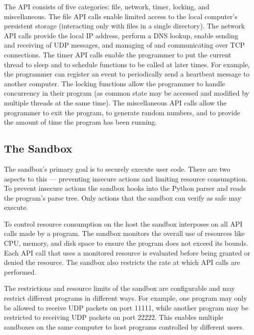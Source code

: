 The API consists of five categories: file, network, timer, locking,
and miscellaneous. The file API calls enable limited access to the
local computer's persistent storage (interacting only with files in a 
single directory). 
The network API calls
provide the local IP address, perform a DNS lookup, enable sending and
receiving of UDP messages, and managing of and communicating over TCP
connections. The timer API calls enable the programmer to put the
current thread to sleep and to schedule functions to be called at
later times. For example, the programmer can register an event to
periodically send a heartbeat message to another computer. The locking
functions allow the programmer to handle concurrency in their program
(as common state may be accessed and modified by multiple threads at
the same time). The miscellaneous API calls allow the programmer to
exit the program, to generate random numbers, and to provide the
amount of time the program has been running.


\subsection{The Sandbox}
\label{sec-repy}

The sandbox's primary goal is to securely execute user code. There are
two aspects to this --- preventing insecure actions and limiting
resource consumption. To prevent insecure actions the sandbox hooks into 
the Python parser and reads the program's parse tree. Only actions that
the sandbox can verify as safe may execute.

To control resource consumption on the host the sandbox interposes on
all API calls made by a program. The sandbox monitors the overall use
of resources like CPU, memory, and disk space to ensure the program
does not exceed its bounds. Each API call that uses a monitored
resource is evaluated before being granted or denied the resource. The
sandbox also restricts the rate at which API calls are performed.

The restrictions and resource limits of the sandbox are configurable and
may restrict different programs in different ways. For example, one 
program may only be
allowed to receive UDP packets on port 11111, while another program
may be restricted to receiving UDP packets on port 22222. This enables
multiple sandboxes on the same computer to host programs controlled by
different users.

